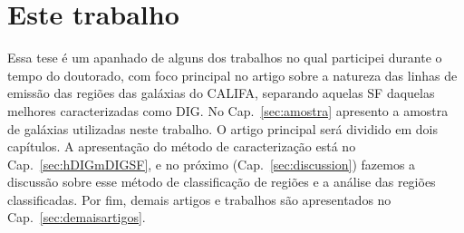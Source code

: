\section{Este trabalho}
\label{sec:intro:estetrabalho}

Essa tese é um apanhado de alguns dos trabalhos no qual participei durante o tempo do doutorado, com foco principal no artigo sobre a natureza das linhas de emissão das regiões das galáxias do CALIFA, separando aquelas SF daquelas melhores caracterizadas como DIG. No Cap.\ \ref{sec:amostra} apresento a amostra de galáxias utilizadas neste trabalho. O artigo principal será dividido em dois capítulos. A apresentação do método de caracterização está no Cap.\  \ref{sec:hDIGmDIGSF}, e no próximo (Cap.\ \ref{sec:discussion}) fazemos a discussão sobre esse método de classificação de regiões e a análise das regiões classificadas. Por fim, demais artigos e trabalhos são apresentados no Cap.\ \ref{sec:demaisartigos}.

